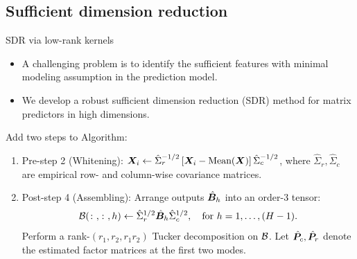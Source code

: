 \documentclass[compress,dvipsnames]{beamer}
\let\olditem\item
\renewcommand\item{\olditem\justifying}
\begin{document}
\subsection{Sufficient dimension reduction}
\begin{frame}{SDR via low-rank kernels}
\begin{itemize}
\item A challenging problem is to identify the {\color{red}sufficient features} with minimal modeling assumption in the prediction model. 
\item We develop a robust sufficient dimension reduction (SDR) method for matrix predictors in high dimensions. 
\end{itemize}

\vspace{.5cm}
Add two steps to Algorithm: 
\begin{enumerate}
\item Pre-step 2 (Whitening): $\bm{X}_i \leftarrow \hat \Sigma^{-1/2}_{r}\left[\bm{X}_i-\text{Mean}(\bm{X})\right]\hat \Sigma^{-1/2}_{c}$, where $\hat \Sigma_{r}, \hat \Sigma_{c}$ are empirical row- and column-wise covariance matrices.
\item Post-step 4 (Assembling): Arrange outputs $\hat {\bm{B}}_h$ into an order-3 tensor:
\[
{\mathcal B}(\colon,\colon,h) \leftarrow \hat \Sigma^{1/2}_{r} \hat {\bm{B}}_h \hat \Sigma^{1/2}_{c},\quad \text{for }h=1,\ldots,(H-1).
\]
Perform a rank-$(r_1,r_2,r_1r_2)$ Tucker decomposition on ${\mathcal B}$. Let $\hat {\bm{P}}_c, \hat {\bm{P}}_r$ denote the estimated factor matrices at the first two modes. 
\end{enumerate}
\end{frame}
\end{document}
